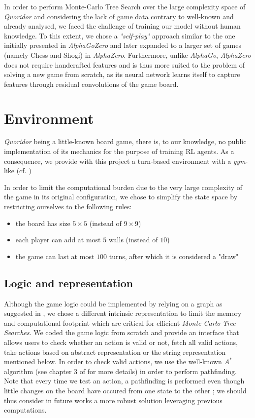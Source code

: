 \documentclass[journal, a4paper]{IEEEtran}
\begin{document}
In order to perform Monte-Carlo Tree Search over the large complexity space of \textit{Quoridor} and considering the lack of game data contrary to well-known and already analysed, we faced the challenge of training our model without human knowledge. To this extent, we chose a \textit{"self-play"} approach similar to the one initially presented in  \textit{AlphaGoZero}\cite{alphagozero} and later expanded to a larger set of games (namely Chess and Shogi) in \textit{AlphaZero}\cite{alphazero}. Furthermore, unlike \textit{AlphaGo}, \textit{AlphaZero} does not require handcrafted features and is thus more suited to the problem of solving a new game from scratch, as its neural network learns itself to capture features through residual convolutions of the game board. 

\section{Environment}
\label{sec:environment}

 \textit{Quoridor} being a little-known board game, there is, to our knowledge, no public implementation of its mechanics for the purpose of training RL agents. As a consequence, we provide with this project a turn-based environment with a \textit{gym}-like (cf. \cite{openai-gym})

In order to limit the computational burden due to the very large complexity of the game in its original configuration, we chose to simplify the state space by restricting ourselves to the following rules:
\begin{itemize}
    \item the board has size $5\times 5$ (instead of $9\times 9$)
    \item each player can add at most $5$ walls (instead of $10$)
    \item the game can last at most $100$ turns, after which it is considered a "draw"
\end{itemize}

\subsection{Logic and representation}
\label{ssec:game-logic}

Although the game logic could be implemented by relying on a graph as suggested in \cite{heuristic-agent}, we chose a different intrinsic representation to limit the memory and computational footprint which are critical for efficient \textit{Monte-Carlo Tree Searches}. We coded the game logic from scratch and provide an interface that allows users to check whether an action is valid or not, fetch all valid actions, take actions based on abstract representation or the string representation mentioned below. In order to check valid actions, we use the well-known $A^*$ algorithm (see chapter 3 of \cite{russel2010} for more details) in order to perform pathfinding. Note that every time we test an action, a pathfinding is performed even though little changes on the board have occured from one state to the other ; we should thus consider in future works a more robust solution leveraging previous computations.
\end{document}
